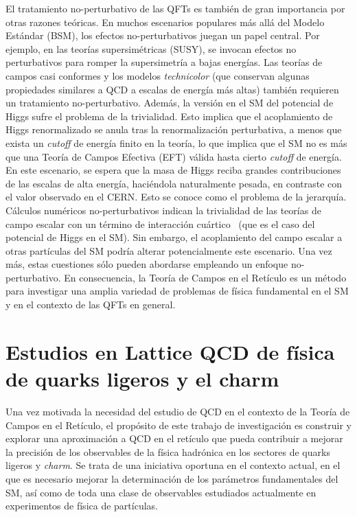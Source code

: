 El tratamiento no-perturbativo de las QFTs es también de gran importancia por otras razones teóricas. En muchos escenarios populares más allá del Modelo Estándar (BSM), los efectos no-perturbativos juegan un papel central. Por ejemplo, en las teorías supersimétricas (SUSY), se invocan efectos no perturbativos para romper la supersimetría a bajas energías. Las teorías de campos casi conformes y los modelos \textit{technicolor} (que conservan algunas propiedades similares a QCD a escalas de energía más altas) también requieren un tratamiento no-perturbativo.  Además, la versión en el SM del potencial de Higgs sufre el problema de la trivialidad. Esto implica que el acoplamiento de Higgs renormalizado se anula tras la renormalización perturbativa, a menos que exista un \textit{cutoff} de energía finito en la teoría, lo que implica que el SM no es más que una Teoría de Campos Efectiva (EFT) válida hasta cierto \textit{cutoff} de energía. En este escenario, se espera que la masa de Higgs reciba grandes contribuciones de las escalas de alta energía, haciéndola naturalmente pesada, en contraste con el valor observado en el CERN. Esto se conoce como el problema de la jerarquía. Cálculos numéricos no-perturbativos indican la trivialidad de las teorías de campo escalar con un término de interacción cuártico~\citep{Luscher:1987ek} (que es el caso del potencial de Higgs en el SM). Sin embargo, el acoplamiento del campo escalar a otras partículas del SM podría alterar potencialmente este escenario. Una vez más, estas cuestiones sólo pueden abordarse empleando un enfoque no-perturbativo. En consecuencia, la Teoría de Campos en el Retículo es un método para investigar una amplia variedad de problemas de física fundamental en el SM y en el contexto de las QFTs en general.

\section*{Estudios en Lattice QCD de física de quarks ligeros y el charm} 

Una vez motivada la necesidad del estudio de QCD en el contexto de la Teoría de Campos en el Retículo, el propósito de este trabajo de investigación es construir y explorar una aproximación a QCD en el retículo que pueda contribuir a mejorar la precisión de los observables de la física hadrónica en los sectores de quarks ligeros y \textit{charm}. Se trata de una iniciativa oportuna en el contexto actual, en el que es necesario mejorar la determinación de los parámetros fundamentales del SM, así como de toda una clase de observables estudiados actualmente en experimentos de física de partículas. 

